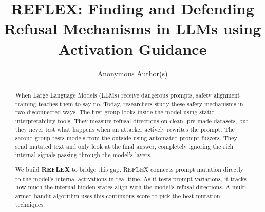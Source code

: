 \documentclass[manuscript,screen,review,anonymous]{acmart}
\begin{document}
\title{REFLEX: Finding and Defending Refusal Mechanisms in LLMs using Activation Guidance}

\author{Anonymous Author(s)}

\renewcommand{\shortauthors}{Anonymous et al.}

\begin{abstract}
When Large Language Models (LLMs) receive dangerous prompts, safety alignment training teaches them to say no. Today, researchers study these safety mechanisms in two disconnected ways. The first group looks inside the model using static interpretability tools. They measure refusal directions on clean, pre-made datasets, but they never test what happens when an attacker actively rewrites the prompt. The second group tests models from the outside using automated prompt fuzzers. They send mutated text and only look at the final answer, completely ignoring the rich internal signals passing through the model's layers.

We build \textbf{REFLEX} to bridge this gap. REFLEX connects prompt mutation directly to the model's internal activations in real time. As it tests prompt variations, it tracks how much the internal hidden states align with the model's refusal directions. A multi-armed bandit algorithm uses this continuous score to pick the best mutation techniques. 


\end{abstract}
\end{document}
